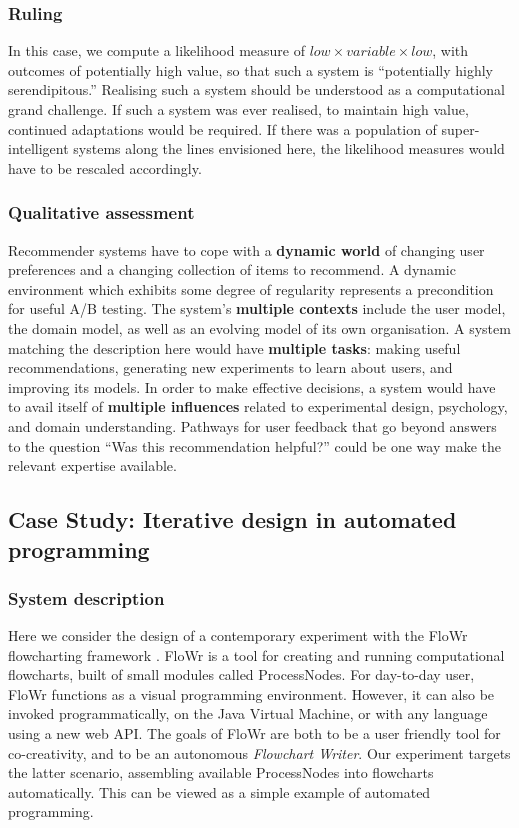 \subsubsection{Ruling}

In this case, we compute a likelihood measure of
$\mathit{low}\times\mathit{variable}\times\mathit{low}$, with outcomes
of potentially high value, so that such a system is ``potentially
highly serendipitous.''  Realising such a system should be understood
as a computational grand challenge.  If such a system was ever
realised, to maintain high value, continued adaptations would be
required.  If there was a population of super-intelligent systems
along the lines envisioned here, the likelihood measures would have to
be rescaled accordingly.

\subsubsection{Qualitative assessment}

Recommender systems have to cope with a \textbf{dynamic world} of changing user preferences and a changing collection of items to recommend.  A dynamic environment which exhibits some degree of regularity represents a precondition for useful A/B testing.  The system's \textbf{multiple contexts} include the user model, the domain model, as well as an evolving model of its own organisation.  A system matching the description here would have \textbf{multiple tasks}: making useful recommendations, generating new experiments to learn about users, and improving its models.  In order to make effective decisions, a system would have to avail itself of \textbf{multiple influences} related to experimental design, psychology, and domain understanding.  Pathways for user feedback that go beyond answers to the question ``Was this recommendation helpful?'' could be one way make the relevant expertise available.

\subsection{Case Study: Iterative design in automated programming} \label{sec:flowchartassembly}

\subsubsection{System description}

Here we consider the design of a contemporary experiment with the
{\sf FloWr} flowcharting framework \cite{colton-flowcharting}.  
%
{\sf FloWr} is a tool for creating and running computational
flowcharts, built of small modules called ProcessNodes.
%
For day-to-day user, {\sf FloWr} functions as a visual programming
environment.  However, it can also be invoked programmatically, on the
Java Virtual Machine, or with any language using a new web API.  The
goals of {\sf FloWr} are both to be a user friendly tool for
co-creativity, and to be an autonomous \emph{Flowchart Writer}.  Our
experiment targets the latter scenario, assembling available
ProcessNodes into flowcharts automatically.  This can be viewed as a
simple example of automated programming.

